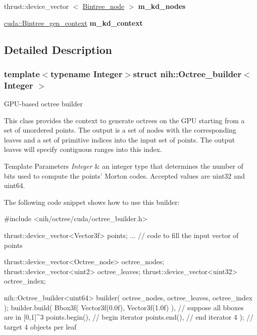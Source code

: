 \begin{DoxyCompactItemize}
\item 
\hypertarget{structnih_1_1_octree__builder_a3ef8a279ed45271b0bef0530932ae4c8}{
thrust\-::device\-\_\-vector\*
$<$ \hyperlink{structnih_1_1_bintree__node}{\-Bintree\-\_\-node} $>$ {\bfseries m\-\_\-kd\-\_\-nodes}}
\label{structnih_1_1_octree__builder_a3ef8a279ed45271b0bef0530932ae4c8}

\item 
\hypertarget{structnih_1_1_octree__builder_ac19a42cbf82d21e270512c0121c329c8}{
\hyperlink{structnih_1_1cuda_1_1_bintree__gen__context}{cuda\-::\-Bintree\-\_\-gen\-\_\-context} {\bfseries m\-\_\-kd\-\_\-context}}
\label{structnih_1_1_octree__builder_ac19a42cbf82d21e270512c0121c329c8}

\end{DoxyCompactItemize}


\subsection{\-Detailed \-Description}
\subsubsection*{template$<$typename Integer$>$struct nih\-::\-Octree\-\_\-builder$<$ Integer $>$}

\-G\-P\-U-\/based octree builder

\-This class provides the context to generate octrees on the \-G\-P\-U starting from a set of unordered points. \-The output is a set of nodes with the corresponding leaves and a set of primitive indices into the input set of points. \-The output leaves will specify contiguous ranges into this index.


\begin{DoxyTemplParams}{\-Template Parameters}
{\em \-Integer} & an integer type that determines the number of bits used to compute the points' \-Morton codes. \-Accepted values are uint32 and uint64.\\
\hline
\end{DoxyTemplParams}
\-The following code snippet shows how to use this builder\-:


\begin{DoxyCode}
 #include <nih/octree/cuda/octree_builder.h>

 thrust::device_vector<Vector3f> points;
 ... // code to fill the input vector of points

 thrust::device_vector<Octree_node> octree_nodes;
 thrust::device_vector<uint2>       octree_leaves;
 thrust::device_vector<uint32>      octree_index;

 nih::Octree_builder<uint64> builder( octree_nodes, octree_leaves, octree_index
       );
 builder.build(
     Bbox3f( Vector3f(0.0f), Vector3f(1.0f) ),   // suppose all bboxes are in
       [0,1]^3
     points.begin(),                             // begin iterator
     points.end(),                               // end iterator
     4 );                                        // target 4 objects per leaf
\end{DoxyCode}
 

